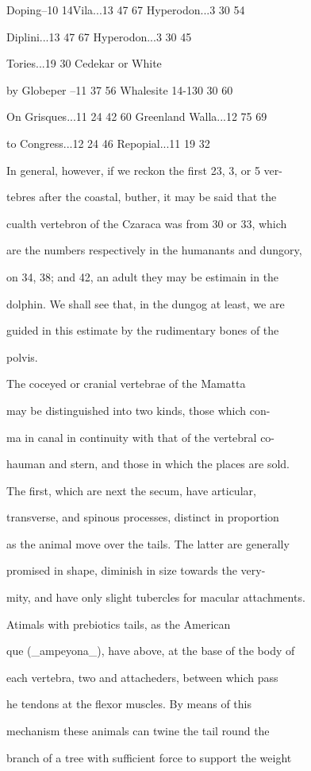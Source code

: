 \documentclass{article}
\begin{document}
Doping–10 14Vila...13 47 67 Hyperodon...3 30 54

Diplini...13 47 67 Hyperodon...3 30 45

Tories...19 30 Cedekar or White

by Globeper –11 37 56 Whalesite 14-130 30 60

On Grisques...11 24 42 60 Greenland Walla...12 75 69

to Congress...12 24 46 Repopial...11 19 32

In general, however, if we reckon the first 23, 3, or 5 ver-

tebres after the coastal, buther, it may be said that the

cualth vertebron of the Czaraca was from 30 or 33, which

are the numbers respectively in the humanants and dungory,

on 34, 38; and 42, an adult they may be estimain in the

dolphin. We shall see that, in the dungog at least, we are

guided in this estimate by the rudimentary bones of the

polvis.

The coceyed or cranial vertebrae of the Mamatta

may be distinguished into two kinds, those which con-

ma in canal in continuity with that of the vertebral co-

hauman and stern, and those in which the places are sold.

The first, which are next the secum, have articular,

transverse, and spinous processes, distinct in proportion

as the animal move over the tails. The latter are generally

promised in shape, diminish in size towards the very-

mity, and have only slight tubercles for macular attachments.

Atimals with prebiotics tails, as the American

que (\_ampeyona\_), have above, at the base of the body of

each vertebra, two and attacheders, between which pass

he tendons at the flexor muscles. By means of this

mechanism these animals can twine the tail round the

branch of a tree with sufficient force to support the weight
\end{document}
